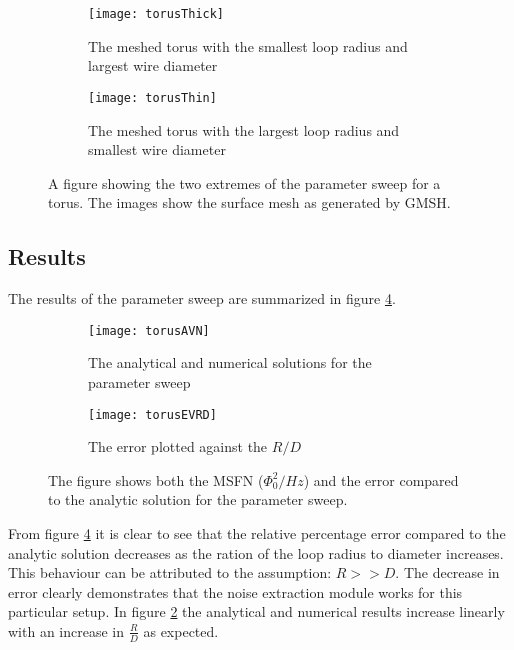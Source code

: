 \begin{figure}[h]
    \centering
    \begin{subfigure}[b]{0.45\textwidth}
        \centering
        \texttt{[image: torusThick]}
        \caption{The meshed torus with the smallest loop radius and largest wire diameter}
    \end{subfigure}
    \hfill
    \begin{subfigure}[b]{0.45\textwidth}
        \centering
        \texttt{[image: torusThin]}
        \caption{The meshed torus with the largest loop radius and smallest wire diameter}
    \end{subfigure}
    \caption{A figure showing the two extremes of the parameter sweep for a torus. The images show the surface mesh as generated by GMSH.}
    \label{fig:meshedTorus}
\end{figure}
\subsection{Results}

The results of the parameter sweep are summarized in figure \ref{fig:resTorus}.
\begin{figure}[H]
    \centering
    \begin{subfigure}[b]{0.48\textwidth}
        \centering
        \texttt{[image: torusAVN]}
        \caption{The analytical and numerical solutions for the parameter sweep}
        \label{fig:MSFNvRD}
    \end{subfigure}
    \hfill
    \begin{subfigure}[b]{0.48\textwidth}
        \centering
        \texttt{[image: torusEVRD]}
        \caption{The error plotted against the $R/D$}
        \label{fig:evRD}
    \end{subfigure}
    \caption{The figure shows both the MSFN ($\Phi_0^2 / Hz$) and the error compared to the analytic solution for the parameter sweep.}
    \label{fig:resTorus}
\end{figure}
From figure \ref{fig:resTorus} it is clear to see that the relative percentage error compared to the analytic solution decreases as the ration of the loop radius to diameter increases. This behaviour can be attributed to the assumption: $R >> D$. The decrease in error clearly demonstrates that the noise extraction module works for this particular setup. In figure \ref{fig:MSFNvRD} the analytical and numerical results increase linearly with an increase in $\frac{R}{D}$ as expected.

